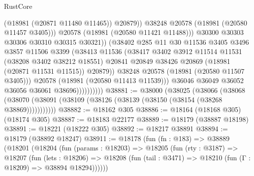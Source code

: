 \begin{lexlean}{RustCore}
\begin{coremodule}
                                      (@18981 (@20871 @11480 @11465))
                                      @20879))
                                  @38248
                                  @20578
                                  (@18981 (@20580 @11457 @3405)))
                                @20578
                                (@18981 (@20580 @11421 @11488)))
                              @30300
                              @30303
                              @30306
                              @30310
                              @30315
                              @30321))
                          (@38402
                            @285
                            @11
                            @30
                            @11536
                            @3405
                            @3496
                            @3857
                            @11506
                            @3399
                            (@38413
                              @11536
                              (@38417
                                @3402
                                @3912
                                @11514
                                @11531
                                (@38208 @3402 @38212 @18551)
                                @20841
                                @20849
                                @38426
                                @20869
                                (@18981 (@20871 @11531 @11515))
                                @20879))
                            @38248
                            @20578
                            (@18981 (@20580 @11507 @3405)))
                          @20578
                          (@18981 (@20580 @11413 @11539)))
                        @36046
                        @36049
                        @36052
                        @36056
                        @36061
                        @38696))))))))))
@38881 := @38000
    (@38025
      (@38066
        (@38068 (@38070 (@38091 (@38109 (@38126 (@38139 (@38150 (@38154 (@38268 @38869)))))))))))
@38882 := @18162 @305
@38886 := @18164 (@18168 @305) (@18174 @305)
@38887 := @18183 @22177
@38889 := @18179 (@38887 @18198)
@38891 := @18221 (@18222 @305)
@38892 := @18217 @38891
@38894 := @18179 (@38892 @18247)
@38911 := @18178
    (fun (fn : @183) =>
    @38889
      (@18201
        (@18204
          (fun (params : @18203) =>
          @18205
            (fun (rty : @3187) =>
            @18207
              (fun (lets : @18206) =>
              @18208 (fun (tail : @3471) => @18210 (fun (Γ : @18209) => @38894 @18294))))))

\end{coremodule}
\end{lexlean}
